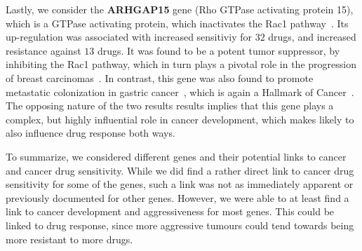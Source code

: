 Lastly, we consider the \textbf{ARHGAP15} gene (Rho GTPase activating protein 15), which is a GTPase activating protein, which inactivates the Rac1 pathway~\cite{arhgap15}. Its up-regulation was associated with increased sensitiviy for $32$ drugs, and increased resistance against $13$ drugs. It was found to be a potent tumor suppressor, by inhibiting the Rac1 pathway, which in turn plays a pivotal role in the progression of breast carcinomas~\cite{arhgap15}. In contrast, this gene was also found to promote metastatic colonization in gastric cancer~\cite{arhgap15_metastasis}, which is again a Hallmark of Cancer~\cite{hallmarks-of-cancer}. The opposing nature of the two results results implies that this gene plays a complex, but highly influential role in cancer development, which makes likely to also influence drug response both ways.

To summarize, we considered different genes and their potential links to cancer and cancer drug sensitivity. While we did find a rather direct link to cancer drug sensitivity for some of the genes, such a link was not as immediately apparent or previously documented for other genes. However, we were able to at least find a link to cancer development and aggressiveness for most genes. This could be linked to drug response, since more aggressive tumours could tend towards being more resistant to more drugs.

